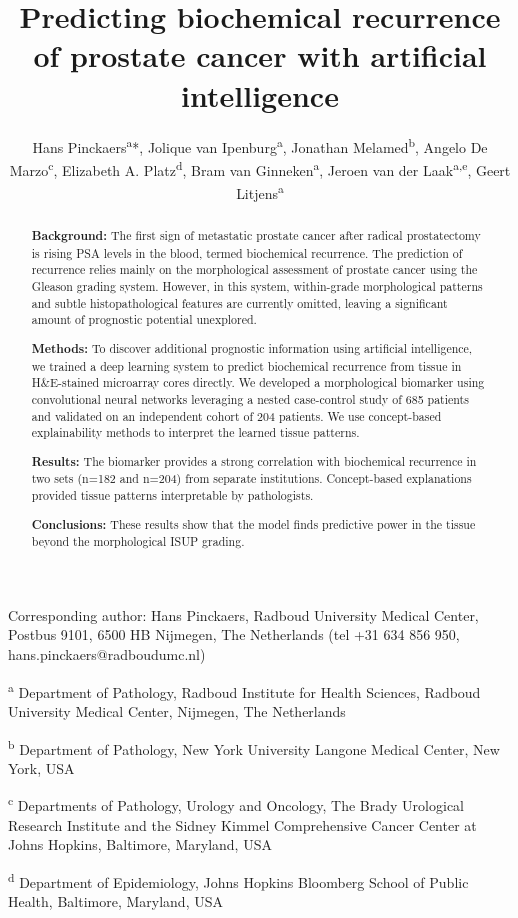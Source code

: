\documentclass[
  12pt,
  a5,margin=2cmpaper,
]{article}
\title{Predicting biochemical recurrence of prostate cancer with
artificial intelligence}
\author{Hans Pinckaers\textsuperscript{a}*, Jolique van
Ipenburg\textsuperscript{a}, Jonathan Melamed\textsuperscript{b}, Angelo
De Marzo\textsuperscript{c}, Elizabeth A. Platz\textsuperscript{d}, Bram
van Ginneken\textsuperscript{a}, Jeroen van der
Laak\textsuperscript{a,e}, Geert Litjens\textsuperscript{a}}
\date{}
\begin{document}
\maketitle
\begin{abstract}
\textbf{Background:} The first sign of metastatic prostate cancer after
radical prostatectomy is rising PSA levels in the blood, termed
biochemical recurrence. The prediction of recurrence relies mainly on
the morphological assessment of prostate cancer using the Gleason
grading system. However, in this system, within-grade morphological
patterns and subtle histopathological features are currently omitted,
leaving a significant amount of prognostic potential unexplored.

\textbf{Methods:} To discover additional prognostic information using
artificial intelligence, we trained a deep learning system to predict
biochemical recurrence from tissue in H\&E-stained microarray cores
directly. We developed a morphological biomarker using convolutional
neural networks leveraging a nested case-control study of 685 patients
and validated on an independent cohort of 204 patients. We use
concept-based explainability methods to interpret the learned tissue
patterns.

\textbf{Results:} The biomarker provides a strong correlation with
biochemical recurrence in two sets (n=182 and n=204) from separate
institutions. Concept-based explanations provided tissue patterns
interpretable by pathologists.

\textbf{Conclusions:} These results show that the model finds predictive
power in the tissue beyond the morphological ISUP grading.
\end{abstract}

Corresponding author: Hans Pinckaers, Radboud University Medical Center,
Postbus 9101, 6500 HB Nijmegen, The Netherlands (tel +31 634 856 950,
hans.pinckaers@radboudumc.nl)

\textsuperscript{a} Department of Pathology, Radboud Institute for
Health Sciences, Radboud University Medical Center, Nijmegen, The
Netherlands

\textsuperscript{b} Department of Pathology, New York University Langone
Medical Center, New York, USA

\textsuperscript{c} Departments of Pathology, Urology and Oncology, The
Brady Urological Research Institute and the Sidney Kimmel Comprehensive
Cancer Center at Johns Hopkins, Baltimore, Maryland, USA

\textsuperscript{d} Department of Epidemiology, Johns Hopkins Bloomberg
School of Public Health, Baltimore, Maryland, USA
\end{document}
